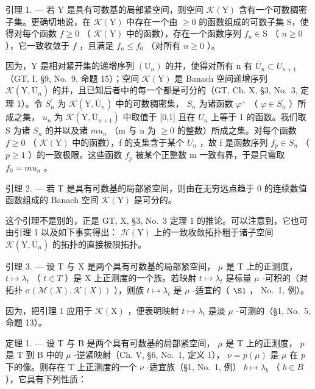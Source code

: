 引理 1. --- 若 Y 是具有可数基的局部紧空间，则空间 \(\mathcal{K}(\mathrm{Y})\) 含有一个可数稠密子集。更确切地说，在 \(\mathcal{K}(\mathrm{Y})\) 中存在一个由 \(\geqslant 0\) 的函数组成的可数子集 S，使得对每个函数 \(f \geqslant 0\) （ \(\mathcal{K}(\mathrm{Y})\) 中的函数），存在一个函数序列 \(f_n \in \mathrm{S}\) （ \(n \geqslant 0\) ），它一致收敛于 \(f\) ，且满足 \(f_n \leqslant f_0\) （对所有 \(n \geqslant 0\) ）。

因为，Y 是相对紧开集的递增序列 \((\mathrm{U}_{n})\) 的并，使得对所有 n 有 \(\overline{U}_{n} \subset U_{n+1}\) （GT, I, §9, No.~9, 命题 15）；空间 \(\mathcal{K}(\mathrm{Y})\) 是 Banach 空间递增序列 \(\mathcal{K}(\mathrm{Y}, \overline{\mathrm{U}}_{n})\) 的并，且已知后者中的每一个都是可分的（GT, Ch. X, §3, No.~3, 定理 1）。令 \(S_{n}^{\prime}\) 为 \(\mathcal{K}(\mathrm{Y}, \overline{\mathrm{U}}_{n})\) 中的可数稠密集， \(S_{n}\) 为诸函数 \(\varphi^{+}\) （ \(\varphi \in S_{n}^{\prime}\) ）所成之集， \(u_{n}\) 为 \(\mathcal{K}(\mathrm{Y}, \overline{\mathrm{U}}_{n+1})\) 中取值于 {[}0,1{]} 且在 \(U_{n}\) 上等于 1 的函数。我们取 S 为诸 \(S_{n}\) 的并以及诸 \(mu_{n}\) （m 与 n 为 \(\geqslant 0\) 的整数）所成之集。对每个函数 \(f \geqslant 0\) （ \(\mathcal{K}(\mathrm{Y})\) 中的函数），f 的支集含于某个 \(U_{n}\) ，故 f 是函数序列 \(f_{p} \in S_{n}\) （ \(p \geqslant 1\) ）的一致极限。这些函数 \(f_{p}\) 被某个正整数 m 一致有界，于是只需取 \(f_{0} = mu_{n}\) 。

引理 2. --- 若 T 是具有可数基的局部紧空间，则由在无穷远点趋于 0 的连续数值函数组成的 Banach 空间 \(\mathcal{K}(\mathrm{Y})\) 是可分的。

这个引理不是别的，正是 GT, X, §3, No.~3 定理 1 的推论。可以注意到，它也可由引理 1 以及如下事实得出： \(\mathcal{H}(\mathrm{Y})\) 上的一致收敛拓扑粗于诸子空间 \(\mathcal{K}(\mathrm{Y},\overline{\mathrm{U}}_n)\) 的拓扑的直接极限拓扑。

引理 3. --- 设 T 与 X 是两个具有可数基的局部紧空间， \(\mu\) 是 T 上的正测度， \(t \mapsto \lambda_{t}\) （ \(t \in T\) ）是 X 上正测度的一个族。若映射 \(t \mapsto \lambda_{t}\) 是标量 \(\mu\) -可积的（对拓扑 \(\sigma(\mathcal{M}(X), \mathcal{K}(X))\) ），则族 \(t \mapsto \lambda_{t}\) 是 \(\mu\) -适宜的（ \(\S1\) ， No.~1, 例）。

因为，把引理 1 应用于 \(\mathcal{K}(\mathrm{X})\) ，便表明映射 \(t \mapsto \lambda_t\) 是淡 \(\mu\) -可测的（§1, No.~5, 命题 13）。

定理 1. --- 设 T 与 B 是两个具有可数基的局部紧空间， \(\mu\) 是 T 上的正测度， \(p\) 是 T 到 B 中的 \(\mu\) -逆紧映射（Ch. V, §6, No.~1, 定义 1）， \(\nu = p(\mu)\) 是 \(\mu\) 在 \(p\) 下的像。则存在 T 上正测度的一个 \(\nu\) -适宜族（§1, No.~1, 例） \(b \mapsto \lambda_b\) （ \(b \in B\) ），它具有下列性质：

